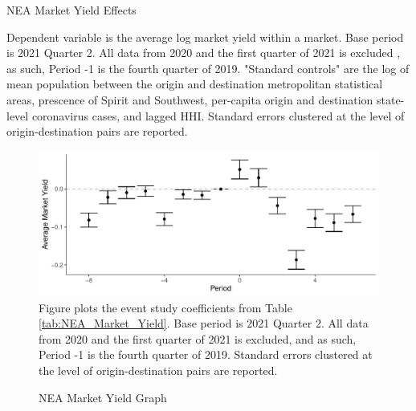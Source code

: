 \documentclass{article}
\begin{document}
\begin{appendices}
	
	
	\begin{table}
		\caption{NEA Market Yield Effects}
		\label{tab:NEA_Market_Yield}
		
		\footnotesize{Dependent variable is the average log market yield within a market. Base period is 2021 Quarter 2. All data from 2020 and the first quarter of 2021 is excluded , as such,  Period -1 is the fourth quarter of 2019. "Standard controls" are the log of mean population between the origin and destination metropolitan statistical areas, prescence of Spirit and Southwest, per-capita origin and destination state-level coronavirus cases, and lagged HHI. Standard errors clustered at the level of origin-destination pairs are reported.  }
	\end{table}
	
	\begin{figure}
		\caption{NEA Market Yield Graph}
		\label{fig:NEA_Market_Yield}
		\includegraphics[width = \linewidth]{NEA_Market_Yield_Graph.pdf}
		\footnotesize{Figure plots the event study coefficients from Table \ref{tab:NEA_Market_Yield}. Base period is 2021 Quarter 2. All data from 2020 and the first quarter of 2021 is excluded, and as such, Period -1 is the fourth quarter of 2019. Standard errors clustered at the level of origin-destination pairs are reported. }
	\end{figure}
	

\end{appendices}
\end{document}
